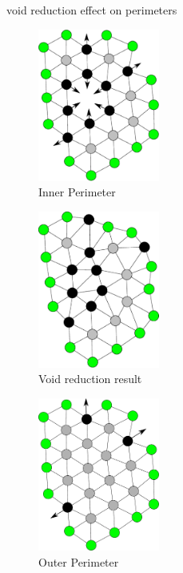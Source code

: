 \documentclass[preprint,12pt]{elsarticle}
\begin{document}
{void reduction effect on perimeters\label{fig:InnerPerimeter2}}
\begin{figure}
\begin{center}
\includegraphics[width=4cm]{figures/PerimeterBotsCircle3}
\end{center}
\caption{Inner Perimeter\label{fig:InnerPerimeter2}}
\end{figure}

\begin{figure}
\begin{center}
\includegraphics[width=4cm]{figures/PerimeterBotsCircle4}
\end{center}
\caption{Void reduction result\label{fig:InnerPerimeter3}}
\end{figure}

\begin{figure}
\begin{center}
\includegraphics[width=4cm]{figures/PerimeterBotsCircle1}
\end{center}
\caption{Outer Perimeter\label{fig:OuterPerimeter2}}
\end{figure}
\end{document}
